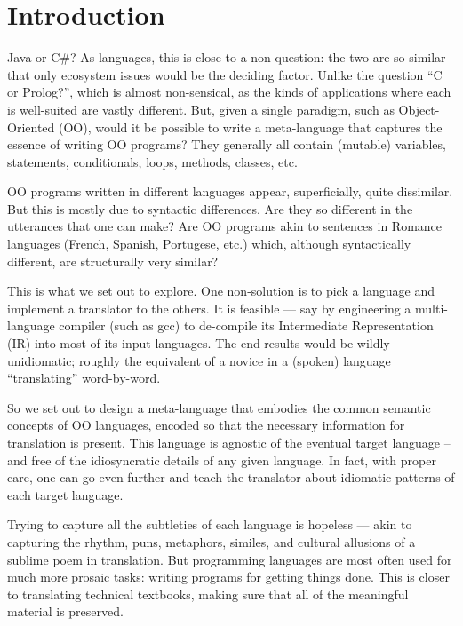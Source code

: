 \documentclass[sigplan,screen,10pt]{acmart}
\newcommand{\Csharp}{C\#}
\begin{document}


\maketitle

\section{Introduction}

Java or \Csharp? As languages, this is close to a 
non-question: the two are so similar that only ecosystem issues
would be the deciding factor.  Unlike the question ``C or Prolog?'', which
is almost non-sensical, as the kinds of applications where each
is well-suited are vastly different.  But, given a single
paradigm, such as Object-Oriented (OO), would it be possible to
write a meta-language that captures the essence of writing
OO programs?  They generally all contain (mutable)
variables, statements, conditionals, loops, methods, classes, etc.

OO programs written in different languages appear, superficially,
quite dissimilar. But this is mostly due to
syntactic differences. Are they so different in the utterances that
one can make? Are OO programs akin to sentences in
Romance languages (French, Spanish, Portugese, etc.) which, although 
syntactically different,
are structurally very similar?

This is what we set out to explore.  One non-solution is to pick a
language and implement a translator to the others.
It is feasible --- say by 
engineering a multi-language compiler (such as gcc) to de-compile its Intermediate 
Representation (IR) into most of its input languages.  The end-results would 
be wildly unidiomatic; roughly the equivalent of a novice
in a (spoken) language ``translating'' word-by-word.

So we set out to design a meta-language that embodies
the common semantic concepts of OO languages, encoded so that the
necessary information for translation is present.  This language is
agnostic of the eventual target language -- and free of
the idiosyncratic details of any given language.
In fact, with proper care, one can go even further and
teach the translator about idiomatic patterns of each target language.

Trying to capture all the subtleties of each language is hopeless ---
akin to capturing the rhythm, puns, metaphors, similes,
and cultural allusions of a sublime poem in translation.  But programming
languages are most often used for much more prosaic tasks: writing programs
for getting things done. This is closer to translating technical textbooks,
making sure that all of the meaningful material is preserved.
\end{document}
